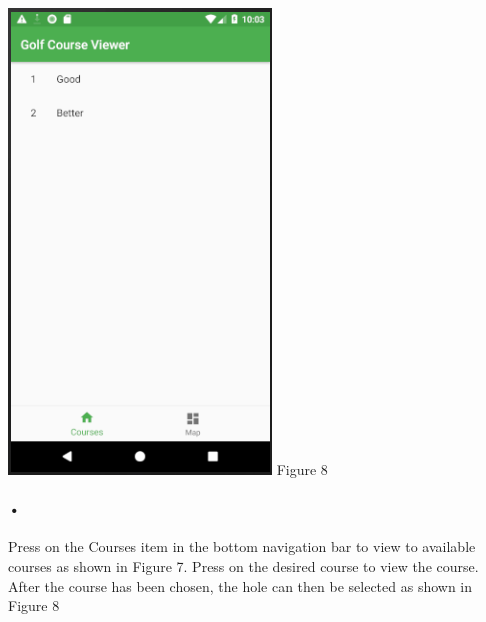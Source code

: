\documentclass{article}
\begin{document}
	\includegraphics[scale=0.7]{Holes.PNG}
	\linebreak
	Figure 8
	
	
	\paragraph{•}
	Press on the Courses item in the bottom navigation bar to view to available courses as shown in Figure 7. Press on the desired course to view the course. After the course has been chosen, the hole can then be selected as shown in Figure 8
	
	

	
	
\end{document}
